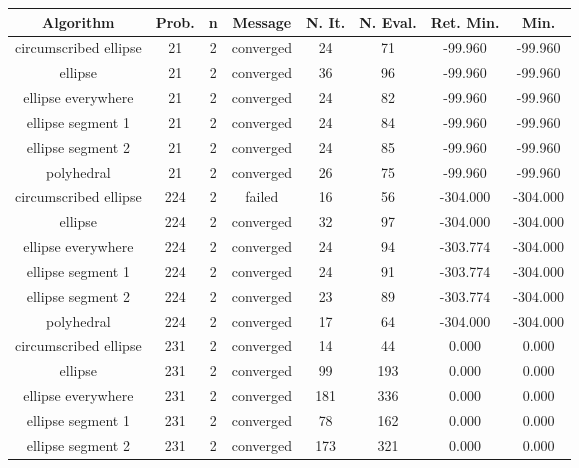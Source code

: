 \begin{scriptsize}
\begin{center}
\begin{longtable}{ c c c c c c c c }
\label{linear_schittowski_results}
Algorithm & Prob. & n & Message & N. It. & N. Eval. & Ret. Min. & Min. \\
\hline
  circumscribed ellipse   &   21  &  2  & converged  &   24  &   71  &  -99.960   &  -99.960   \\
         ellipse          &   21  &  2  & converged  &   36  &   96  &  -99.960   &  -99.960   \\
    ellipse everywhere    &   21  &  2  & converged  &   24  &   82  &  -99.960   &  -99.960   \\
    ellipse segment 1     &   21  &  2  & converged  &   24  &   84  &  -99.960   &  -99.960   \\
    ellipse segment 2     &   21  &  2  & converged  &   24  &   85  &  -99.960   &  -99.960   \\
        polyhedral        &   21  &  2  & converged  &   26  &   75  &  -99.960   &  -99.960   \\
  circumscribed ellipse   &  224  &  2  &   failed   &   16  &   56  &  -304.000  &  -304.000  \\
         ellipse          &  224  &  2  & converged  &   32  &   97  &  -304.000  &  -304.000  \\
    ellipse everywhere    &  224  &  2  & converged  &   24  &   94  &  -303.774  &  -304.000  \\
    ellipse segment 1     &  224  &  2  & converged  &   24  &   91  &  -303.774  &  -304.000  \\
    ellipse segment 2     &  224  &  2  & converged  &   23  &   89  &  -303.774  &  -304.000  \\
        polyhedral        &  224  &  2  & converged  &   17  &   64  &  -304.000  &  -304.000  \\
  circumscribed ellipse   &  231  &  2  & converged  &   14  &   44  &   0.000    &   0.000    \\
         ellipse          &  231  &  2  & converged  &   99  &  193  &   0.000    &   0.000    \\
    ellipse everywhere    &  231  &  2  & converged  &  181  &  336  &   0.000    &   0.000    \\
    ellipse segment 1     &  231  &  2  & converged  &   78  &  162  &   0.000    &   0.000    \\
    ellipse segment 2     &  231  &  2  & converged  &  173  &  321  &   0.000    &   0.000    \\

\end{longtable}
\end{center}
\end{scriptsize}
